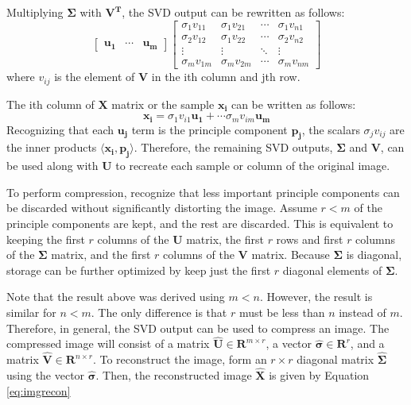 \documentclass[conference]{IEEEtran}
\begin{document}
	Multiplying $\mathbf{\Sigma}$ with $\mathbf{V^T}$, the SVD output can be rewritten as follows:
	\begin{equation}
		\begin{bmatrix}
			\mathbf{u_1} & \cdots & \mathbf{u_m}
		\end{bmatrix}\begin{bmatrix}
			\sigma_1v_{11} & \sigma_1v_{21} & \cdots & \sigma_1v_{n1}\\
			\sigma_2v_{12} & \sigma_1v_{22} & \cdots & \sigma_2v_{n2}\\
			\vdots & \vdots & \ddots & \vdots\\
			\sigma_mv_{1m} & \sigma_mv_{2m} & \cdots & \sigma_mv_{nm}
		\end{bmatrix}
	\end{equation}
    	where $v_{ij}$ is the element of $\mathbf{V}$ in the ith column and jth row.
    	
    	The ith column of $\mathbf{X}$ matrix or the sample $\mathbf{x_i}$ can be written as follows:
	\begin{equation*}
		\mathbf{x_i} = \sigma_1v_{i1}\mathbf{u_1} + \cdots \sigma_mv_{im}\mathbf{u_m}
	\end{equation*}   	
    	Recognizing that each $\mathbf{u_j}$ term is the principle component $\mathbf{p_j}$, the scalars $\sigma_jv_{ij}$ are the inner products $\langle \mathbf{x_i}, \mathbf{p_j}\rangle$. Therefore, the remaining SVD outputs, $\mathbf{\Sigma}$ and $\mathbf{V}$, can be used along with $\mathbf{U}$ to recreate each sample or column of the original image.  
    	
    	To perform compression, recognize that less important principle components can be discarded without significantly distorting the image.  Assume $r < m$ of the principle components are kept, and the rest are discarded. This is equivalent to keeping the first $r$ columns of the $\mathbf{U}$ matrix, the first $r$ rows and first $r$ columns of the $\mathbf{\Sigma}$ matrix, and the first $r$ columns of the $\mathbf{V}$ matrix. Because $\mathbf{\Sigma}$ is diagonal, storage can be further optimized by keep just the first $r$ diagonal elements of $\mathbf{\Sigma}$.
    	
    Note that the result above was derived using $m < n$. However, the result is similar for $n < m$. The only difference is that $r$ must be less than $n$ instead of $m$. Therefore, in general, the SVD output can be used to compress an image. The compressed image will consist of a matrix $\mathbf{\hat{U}} \in \mathbf{R}^{m \times r}$, a vector $\mathbf{\hat{\sigma}} \in \mathbf{R}^{r}$, and a matrix $\mathbf{\hat{V}} \in \mathbf{R}^{n \times r}$. To reconstruct the image, form an $r \times r$ diagonal matrix $\mathbf{\hat{\Sigma}}$ using the vector $\mathbf{\hat{\sigma}}$. Then, the reconstructed image $\mathbf{\hat{X}}$ is given by Equation \ref{eq:imgrecon}
\end{document}
